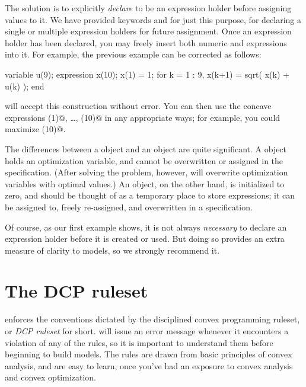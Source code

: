 \documentclass[12pt]{article}
\begin{document}
The solution is to explicitly \emph{declare} \verb@x@ to be an 
expression holder before assigning values to it. 
We have provided keywords \verb@expression@
and \verb@expressions@ for just this purpose, for declaring a single or 
multiple expression holders for future assignment. Once an expression holder
has been declared, you may freely insert both numeric and \cvx expressions
into it. For example, the previous
example can be corrected as follows:
\begin{code}
variable u(9);
expression x(10);
x(1) = 1;
for k = 1 : 9,
    x(k+1) = sqrt( x(k) + u(k) );
end
\end{code}
\cvx will accept this construction without error.
You can then use the concave expressions \verb@x(1)@, \ldots, \verb@x(10)@
in any appropriate ways; for example, you could maximize \verb@x(10)@.

The differences between a \verb@variable@ object and an \verb@expression@ object
are quite significant. 
A \verb@variable@ object holds an optimization
variable, and cannot be overwritten or assigned in the \cvx specification.
(After solving the problem, however, \cvx will overwrite 
optimization variables with optimal values.) 
An \verb@expression@ object, on the other hand, is initialized to zero, 
and should be thought of as a temporary place to store \cvx expressions;
it can be assigned to, freely re-assigned, and overwritten in a \cvx
specification.

Of course, as our first example
shows, it is not always \emph{necessary} to declare an expression holder before
it is created or used. But doing so provides an extra measure
of clarity to models, so we strongly recommend it.

\newpage
\section{The DCP ruleset}
\label{sec:rules}

\cvx enforces the conventions dictated by the
disciplined convex programming ruleset, or \emph{DCP ruleset} for short.
\cvx will issue an error message whenever it encounters a violation 
of any of the rules, so it is important to understand
them before beginning to build models. 
The rules are drawn from basic principles of convex analysis, and 
are easy to learn, once you've had an exposure to convex analysis
and convex optimization.
\end{document}
